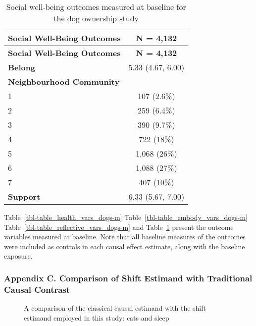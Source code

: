 \documentclass[
  singlecolumn,
  9pt]{article}
\begin{document}
\begin{longtable}[]{@{}lc@{}}
\caption{Social well-being outcomes measured at baseline for the dog
ownership study}\label{tbl-table_social_vars_dogs-m}\tabularnewline
\toprule\noalign{}
\textbf{Social Well-Being Outcomes} & \textbf{N = 4,132} \\
\midrule\noalign{}
\endfirsthead
\toprule\noalign{}
\textbf{Social Well-Being Outcomes} & \textbf{N = 4,132} \\
\midrule\noalign{}
\endhead
\bottomrule\noalign{}
\endlastfoot
\textbf{Belong} & 5.33 (4.67, 6.00) \\
\textbf{Neighbourhood Community} & \\
1 & 107 (2.6\%) \\
2 & 259 (6.4\%) \\
3 & 390 (9.7\%) \\
4 & 722 (18\%) \\
5 & 1,068 (26\%) \\
6 & 1,088 (27\%) \\
7 & 407 (10\%) \\
\textbf{Support} & 6.33 (5.67, 7.00) \\
\end{longtable}

Table~\ref{tbl-table_health_vars_dogs-m}
Table~\ref{tbl-table_embody_vars_dogs-m}
Table~\ref{tbl-table_reflective_vars_dogs-m} and
Table~\ref{tbl-table_social_vars_dogs-m} present the outcome variables
measured at baseline. Note that all baseline measures of the outcomes
were included as controls in each causal effect estimate, along with the
baseline exposure.

\newpage{}

\subsubsection{Appendix C. Comparison of Shift Estimand with Traditional
Causal
Contrast}\label{appendix-c.-comparison-of-shift-estimand-with-traditional-causal-contrast}

\begin{figure}


\caption{\label{fig-comparative-graph-cats}A comparison of the classical
causal estimand with the shift estimand employed in this study: cats and
sleep}

\end{figure}%
\end{document}
